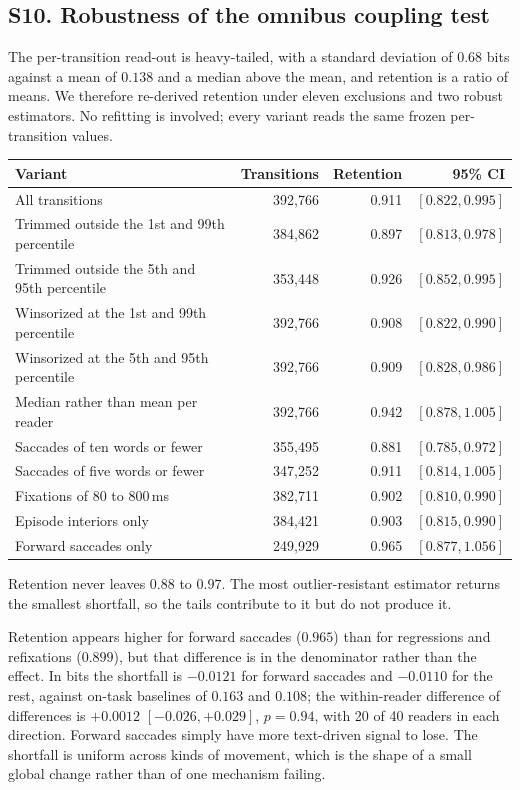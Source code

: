 \documentclass[11pt]{article}
\begin{document}
\subsection*{S10. Robustness of the omnibus coupling test}

The per-transition read-out is heavy-tailed, with a standard deviation of $0.68$ bits against a
mean of $0.138$ and a median above the mean, and retention is a ratio of means. We therefore
re-derived retention under eleven exclusions and two robust estimators. No refitting is
involved; every variant reads the same frozen per-transition values.

\begin{center}
\small
\begin{tabular}{lrrr}
\toprule
Variant & Transitions & Retention & 95\% CI \\
\midrule
All transitions & 392,766 & 0.911 & $[0.822, 0.995]$ \\
Trimmed outside the 1st and 99th percentile & 384,862 & 0.897 & $[0.813, 0.978]$ \\
Trimmed outside the 5th and 95th percentile & 353,448 & 0.926 & $[0.852, 0.995]$ \\
Winsorized at the 1st and 99th percentile & 392,766 & 0.908 & $[0.822, 0.990]$ \\
Winsorized at the 5th and 95th percentile & 392,766 & 0.909 & $[0.828, 0.986]$ \\
Median rather than mean per reader & 392,766 & 0.942 & $[0.878, 1.005]$ \\
Saccades of ten words or fewer & 355,495 & 0.881 & $[0.785, 0.972]$ \\
Saccades of five words or fewer & 347,252 & 0.911 & $[0.814, 1.005]$ \\
Fixations of 80 to 800\,\si{\milli\second} & 382,711 & 0.902 & $[0.810, 0.990]$ \\
Episode interiors only & 384,421 & 0.903 & $[0.815, 0.990]$ \\
Forward saccades only & 249,929 & 0.965 & $[0.877, 1.056]$ \\
\bottomrule
\end{tabular}
\end{center}

Retention never leaves $0.88$ to $0.97$. The most outlier-resistant estimator returns the
smallest shortfall, so the tails contribute to it but do not produce it.

Retention appears higher for forward saccades ($0.965$) than for regressions and refixations
($0.899$), but that difference is in the denominator rather than the effect. In bits the
shortfall is $-0.0121$ for forward saccades and $-0.0110$ for the rest, against on-task baselines
of $0.163$ and $0.108$; the within-reader difference of differences is $+0.0012$
$[-0.026, +0.029]$, $p=0.94$, with 20 of 40 readers in each direction. Forward saccades simply
have more text-driven signal to lose. The shortfall is uniform across kinds of movement, which
is the shape of a small global change rather than of one mechanism failing.
\end{document}
